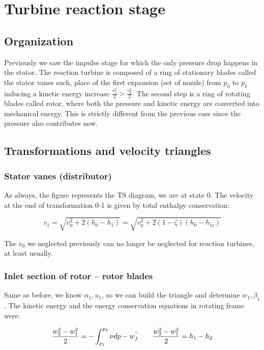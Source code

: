 \section{Turbine reaction stage}
\subsection{Organization}
Previously we saw the impulse stage for which the only pressure drop happens in the stator. The reaction turbine is composed of a ring of stationary blades called the stator vanes such, place of the first expansion (set of nozzle) from $p_0$ to $p_1$ inducing a kinetic energy increase $\frac{v_1^2}{2}>\frac{v_0^2}{2}$. The second step is a ring of rotating blades called rotor, where both the pressure and kinetic energy are converted into mechanical energy. This is strictly different from the previous case since the pressure also contributes now. 

\subsection{Transformations and velocity triangles}
\subsubsection{Stator vanes (distributor)}
As always, the figure represents the TS diagram, we are at state 0. The velocity at the end of transformation 0-1 is given by total enthalpy conservation: 

\begin{equation}
v_1 = \sqrt{v_0^2 + 2(h_{0}- h_{1})} = \sqrt{v_0^2 + 2(1-\zeta)(h_{0}- h_{1i})}
\end{equation}

The $v_0$ we neglected previously can no longer be neglected for reaction turbines, at least usually. 

\subsubsection{Inlet section of rotor – rotor blades} 
Same as before, we know $\alpha _1, u_1$, so we can build the triangle and determine $w_1,\beta _1$. The kinetic energy and the energy conservation equations in rotating frame were: 

\begin{equation}
\frac{w_2^2 - w_1^2}{2} = - \int _{p_1}^{p_2} \nu dp - w^"_f \qquad \frac{w_2^2 - w_1^2}{2} = h_1 - h_2 
\end{equation}

